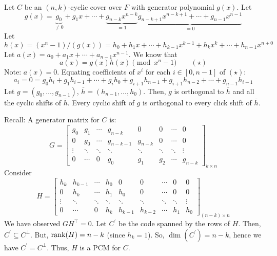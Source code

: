Let $ C $ be an $ (n,k) $-cyclic cover over $ F $ with generator
polynomial $ g(x) $. Let
\[ g(x)=\underbrace{g_0}_{\neq 0}+g_1x+\cdots+\underbrace{g_{n-k}x^{n-k}}_{=1}
    \underbrace{g_{n-k+1}x^{n-k+1}+\cdots+g_{n-1}x^{n-1}}_{=0} \]
Let
\[ h(x)=(x^n-1)/(g(x))=h_0+h_1x+\cdots+h_{k-1}x^{k-1}+h_k x^k+\cdots+h_{n-1}x^{n+0} \]
Let $ a(x)=a_0+a_1x+\cdots+a_{n-1}x^{n-1} $. We know that
\[ a(x)=g(x)h(x)\pmod{x^n-1} \qquad (\star) \]
Note: $ a(x)=0 $. Equating coefficients of $ x^i $ for each $ i\in [0,n-1] $
of $ (\star) $:
\[ a_i=0=g_0h_i+g_1h_{i-1}+\cdots+g_i h_0+g_{i+1}h_{n-1}
    +g_{i+1}h_{n-2}+\cdots+g_{n-1}h_{i-1} \]
Let $ g=(g_0,\ldots ,g_{n-1}) $, $ \overline{h}=(h_{n-1},\ldots ,h_0) $.
Then, $ g $ is orthogonal to $ \overline{h} $ and all the cyclic shifts
of $ \overline{h} $. Every cyclic shift of $ g $ is orthogonal to
every click shift of $ \overline{h} $.

Recall: A generator matrix for $ C $ is:
\[ G=
    \left[
        \begin{array}{cccccccc}
            g_{0}  & g_{1}  & \cdots & g_{n-k}   & 0       & 0      & \cdots & 0       \\
            0      & g_{0}  & \cdots & g_{n-k-1} & g_{n-k} & 0      & \cdots & 0       \\
            \vdots & \ddots & \ddots & \ddots    & \ddots  & \ddots & \ddots & \vdots  \\
            0      & \cdots & 0      & g_{0}     & g_{1}   & g_{2}  & \cdots & g_{n-k}
        \end{array}
        \right]_{k \times{} n} \]
Consider
\[ H=
    \left[
        \begin{array}{ccccccccc}
            h_{k}  & h_{k-1} & \cdots & h_{0}  & 0       & 0       & \cdots & 0      & 0      \\
            0      & h_{k}   & \cdots & h_{1}  & h_{0}   & 0       & \cdots & 0      & 0      \\
            \vdots & \ddots  & \ddots & \ddots & \ddots  & \ddots  & \ddots & \ddots & \vdots \\
            0      & \cdots  & 0      & h_{k}  & h_{k-1} & h_{k-2} & \cdots & h_{1}  & h_{0}
        \end{array}
        \right]_{(n-k) \times{} n} \]
We have observed $ GH^{\top}=0 $. Let $ C^{\prime} $ be the code
spanned by the rows of $ H $. Then, $ C^{\prime}\subseteq C^{\perp} $.
But, $ \operatorname{rank}(H)=n-k $ (since $ h_k=1 $). So, $ \dim(C^\prime)=n-k $,
hence we have $ C^\prime=C^{\perp} $. Thus, $ H $ is a PCM for $ C $.

